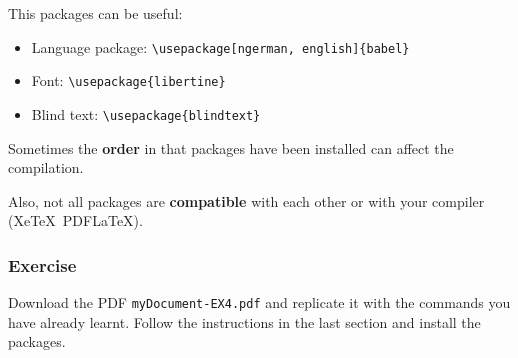 \begin{frame}[fragile]

This packages can be useful:
\begin{itemize}


\item Language package:  \hfill 
\lstinline|\usepackage[ngerman, english]{babel}|


\item Font:  \hfill 
\lstinline|\usepackage{libertine}|

\item Blind text:  \hfill 
\lstinline|\usepackage{blindtext}|
\end{itemize}

Sometimes the \textbf{order} in that packages have been installed can affect the compilation.

Also, not all packages are \textbf{compatible} with each other or with your compiler (Xe\TeX\ \vs PDF\LaTeX ).

\end{frame}


\begin{frame}[fragile]
\frametitle{Exercise}

Download the PDF \alert{\texttt{myDocument-EX4.pdf}} and replicate it with the commands you have already learnt. Follow the instructions in the last section and install the packages.

\end{frame}


%
%
%


%	
%
%
%

